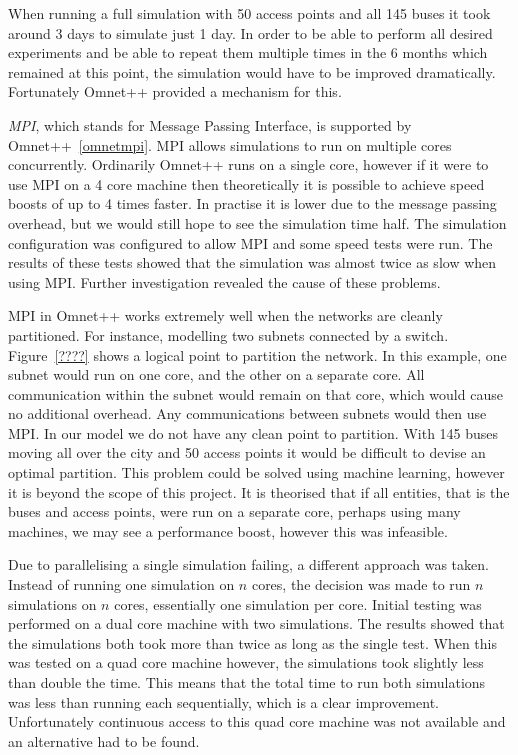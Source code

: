 
            When running a full simulation with 50 access points and all 145 buses it took around 3 days to simulate just 1 day. In order to be able to perform all desired experiments and be able to repeat them multiple times in the 6 months which remained at this point, the simulation would have to be improved dramatically. Fortunately Omnet++ provided a mechanism for this. 

            \emph{MPI}, which stands for Message Passing Interface, is supported by Omnet++~\ref{omnetmpi}. MPI allows simulations to run on multiple cores concurrently. Ordinarily Omnet++ runs on a single core, however if it were to use MPI on a 4 core machine then theoretically it is possible to achieve speed boosts of up to 4 times faster. In practise it is lower due to the message passing overhead, but we would still hope to see the simulation time half. The simulation configuration was configured to allow MPI and some speed tests were run. The results of these tests showed that the simulation was almost twice as slow when using MPI. Further investigation revealed the cause of these problems. 

            

            MPI in Omnet++ works extremely well when the networks are cleanly partitioned. For instance, modelling two subnets connected by a switch. Figure~\ref{????} shows a logical point to partition the network. In this example, one subnet would run on one core, and the other on a separate core. All communication within the subnet would remain on that core, which would cause no additional overhead. Any communications between subnets would then use MPI. In our model we do not have any clean point to partition. With 145 buses moving all over the city and 50 access points it would be difficult to devise an optimal partition. This problem could be solved using machine learning, however it is beyond the scope of this project. It is theorised that if all entities, that is the buses and access points, were run on a separate core, perhaps using many machines, we may see a performance boost, however this was infeasible. 

            Due to parallelising a single simulation failing, a different approach was taken. Instead of running one simulation on $n$ cores, the decision was made to run $n$ simulations on $n$ cores, essentially one simulation per core. Initial testing was performed on a dual core machine with two simulations. The results showed that the simulations both took more than twice as long as the single test. When this was tested on a quad core machine however, the simulations took slightly less than double the time. This means that the total time to run both simulations was less than running each sequentially, which is a clear improvement. Unfortunately continuous access to this quad core machine was not available and an alternative had to be found. 


